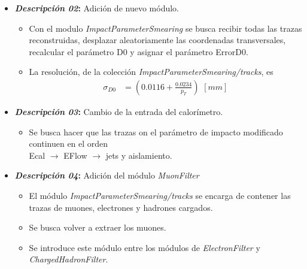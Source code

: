\begin{itemize}
\begin{itemize}
\begin{itemize}
                \item Se añaden al ExecutionPath los módulos \textit{ImpactParameterSmearing}, después del módulo \textit{TrackMerger}, y \textit{MuonFilter}, antes del módulo \textit{MuonEfficiency}.
                \item \textit{ExecutionPath} se encarga de indicar el orden en el que Delphes procesa las colecciones.
            \end{itemize}
            \item[$\divideontimes$] \textbf{\textit{Descripción 02}:} Adición de nuevo módulo.
            \begin{itemize}
                \item Con el modulo \textit{ImpactParameterSmearing} se busca recibir todas las trazas reconstruidas, desplazar aleatoriamente las coordenadas transversales, recalcular el parámetro D0 y asignar el parámetro ErrorD0.
                \item La resolución, de la colección \textit{ImpactParameterSmearing/tracks}, es
                \begin{equation*}
                    \begin{aligned}
                        \sigma_{D0} & = \left(0.0116 + \frac{0.0234}{p_{T}}\right) \,\,[mm]
                    \end{aligned}
                \end{equation*}
            \end{itemize}
            \item[$\divideontimes$] \textbf{\textit{Descripción 03}:} Cambio de la entrada del calorímetro.
            \begin{itemize}
                \item Se busca hacer que las trazas on el parámetro de impacto modificado continuen en el orden\\Ecal $\to$ EFlow $\to$ jets y aislamiento.
            \end{itemize}
            \item[$\divideontimes$] \textbf{\textit{Descripción 04}:} Adición del módulo \textit{MuonFilter}
            \begin{itemize}
                \item El módulo \textit{ImpactParameterSmearing/tracks} se encarga de contener las trazas de muones, electrones y hadrones cargados.
                \item Se busca volver a extraer los muones.
                \item Se introduce este módulo entre los módulos de \textit{ElectronFilter} y \textit{ChargedHadronFilter}.

\end{itemize}
\end{itemize}
\end{itemize}
